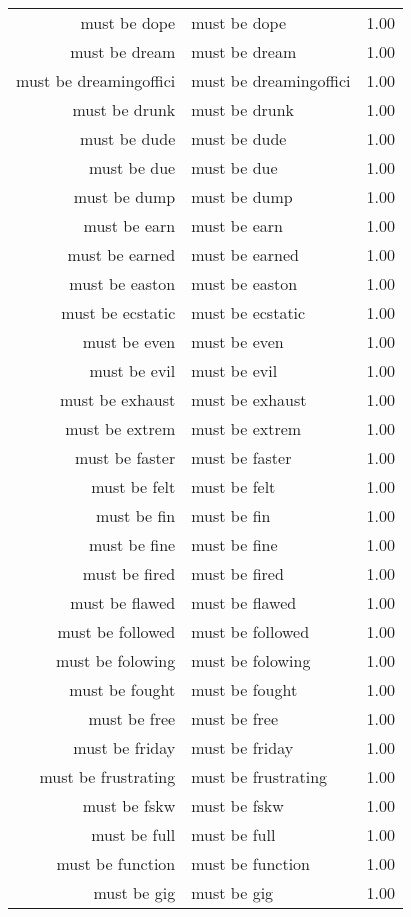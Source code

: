 \begin{table}[ht]
\begin{tabular}{rlr}
  must be dope & must be dope & 1.00 \\ 
  must be dream & must be dream & 1.00 \\ 
  must be dreamingoffici & must be dreamingoffici & 1.00 \\ 
  must be drunk & must be drunk & 1.00 \\ 
  must be dude & must be dude & 1.00 \\ 
  must be due & must be due & 1.00 \\ 
  must be dump & must be dump & 1.00 \\ 
  must be earn & must be earn & 1.00 \\ 
  must be earned & must be earned & 1.00 \\ 
  must be easton & must be easton & 1.00 \\ 
  must be ecstatic & must be ecstatic & 1.00 \\ 
  must be even & must be even & 1.00 \\ 
  must be evil & must be evil & 1.00 \\ 
  must be exhaust & must be exhaust & 1.00 \\ 
  must be extrem & must be extrem & 1.00 \\ 
  must be faster & must be faster & 1.00 \\ 
  must be felt & must be felt & 1.00 \\ 
  must be fin & must be fin & 1.00 \\ 
  must be fine & must be fine & 1.00 \\ 
  must be fired & must be fired & 1.00 \\ 
  must be flawed & must be flawed & 1.00 \\ 
  must be followed & must be followed & 1.00 \\ 
  must be folowing & must be folowing & 1.00 \\ 
  must be fought & must be fought & 1.00 \\ 
  must be free & must be free & 1.00 \\ 
  must be friday & must be friday & 1.00 \\ 
  must be frustrating & must be frustrating & 1.00 \\ 
  must be fskw & must be fskw & 1.00 \\ 
  must be full & must be full & 1.00 \\ 
  must be function & must be function & 1.00 \\ 
  must be gig & must be gig & 1.00 \\ 

\end{tabular}
\end{table}
